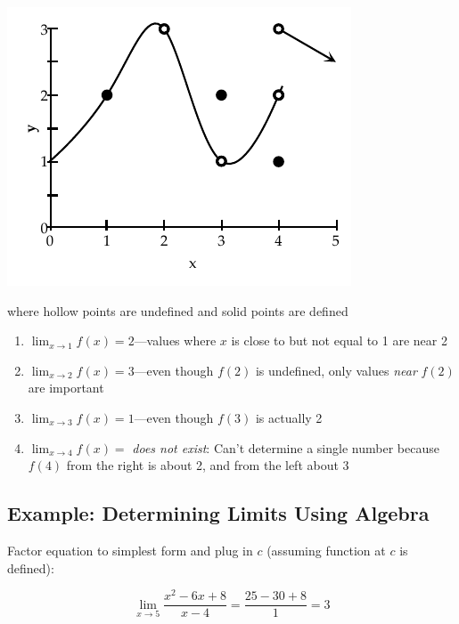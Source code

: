 \begin{center}
    \includegraphics{limits_ex2}
\end{center}

where hollow points are undefined and solid points are defined

\begin{enumerate}
    \item $\lim_{x \rightarrow 1} f(x) = 2$---values where $x$ is close to but not equal to 1 are near 2
    \item $\lim_{x \rightarrow 2} f(x) = 3$---even though $f(2)$ is undefined, only values \textit{near} $f(2)$ are important
    \item $\lim_{x \rightarrow 3} f(x) = 1$---even though $f(3)$ is actually 2
    \item $\lim_{x \rightarrow 4} f(x) =$ \textit{does not exist}: Can't determine a single number because $f(4)$ from the right is about 2, and from the left about 3
\end{enumerate}


\subsection*{Example: Determining Limits Using Algebra}

Factor equation to simplest form and plug in $c$ (assuming function at $c$ is defined):

\begin{equation}
    \lim_{x \rightarrow 5} \frac{x^2 - 6x + 8}{x - 4} = \frac{25 - 30 + 8}{1} = 3
\end{equation}
\hformbar




